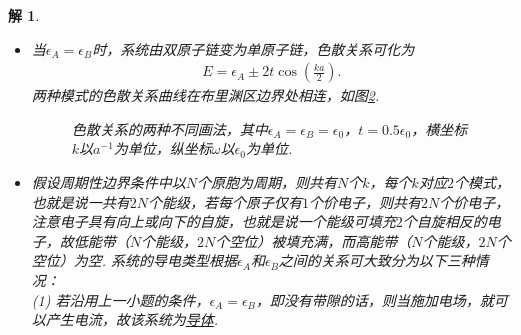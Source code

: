 \documentclass[UTF8,10pt,a4paper]{article}
\theoremstyle{Problem}
\theoremstyle{Solution}
\newtheorem*{sol}{解}
\begin{document}
\begin{sol}
\begin{itemize}
\begin{figure}[h]
            \caption{色散关系的两种不同画法，其中$\epsilon_A=\epsilon_0$，$\epsilon_B=2\epsilon_0$，$t=0.5\epsilon_0$，横坐标$k$以$a^{-1}$为单位，纵坐标$\omega$以$\epsilon_0$为单位.}
            \label{3-E-k}
        \end{figure}
        \item[$\triangleright$] 当$\epsilon_A=\epsilon_B$时，系统由双原子链变为单原子链，色散关系可化为
        \begin{align}
            E=\epsilon_A\pm 2t\cos\left(\frac{ka}{2}\right).
        \end{align}
        两种模式的色散关系曲线在布里渊区边界处相连，如图\ref{3-E-k-2}.
        \begin{figure}[h]
            \centering
            \caption{色散关系的两种不同画法，其中$\epsilon_A=\epsilon_B=\epsilon_0$，$t=0.5\epsilon_0$，横坐标$k$以$a^{-1}$为单位，纵坐标$\omega$以$\epsilon_0$为单位.}
            \label{3-E-k-2}
        \end{figure}
        \item[$\triangleright$] 假设周期性边界条件中以$N$个原胞为周期，则共有$N$个$k$，每个$k$对应$2$个模式，也就是说一共有$2N$个能级，若每个原子仅有$1$个价电子，则共有$2N$个价电子，注意电子具有向上或向下的自旋，也就是说一个能级可填充$2$个自旋相反的电子，故低能带（$N$个能级，$2N$个空位）被填充满，而高能带（$N$个能级，$2N$个空位）为空. 系统的导电类型根据$\epsilon_A$和$\epsilon_B$之间的关系可大致分为以下三种情况：\\
        (1) 若沿用上一小题的条件，$\epsilon_A=\epsilon_B$，即没有带隙的话，则当施加电场，就可以产生电流，故该系统为\underline{导体}.\\

\end{itemize}
\end{sol}
\end{document}
